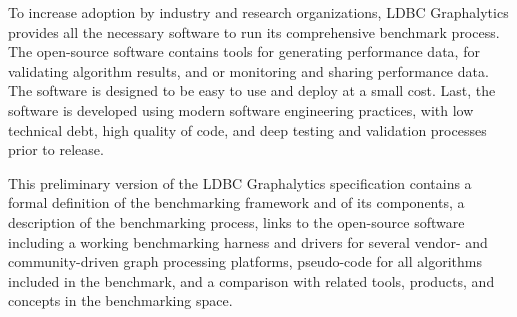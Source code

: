 {To increase adoption by industry and research organizations, 
LDBC Graphalytics provides all the necessary software to run its comprehensive benchmark process.
The open-source software contains tools for generating performance data, for validating algorithm results, 
and or monitoring and sharing performance data. 
The software is designed to be easy to use and deploy at a small cost.
Last, the software is developed using modern software engineering practices, 
with low technical debt, high quality of code, and deep testing and validation processes prior to release. 

This preliminary version of the LDBC Graphalytics specification contains 
a formal definition of the benchmarking framework and of its components, 
a description of the benchmarking process,
links to the open-source software including a working benchmarking harness and drivers for several vendor- and community-driven graph processing platforms,
pseudo-code for all algorithms included in the benchmark,
and a comparison with related tools, products, and concepts in the benchmarking space.

}